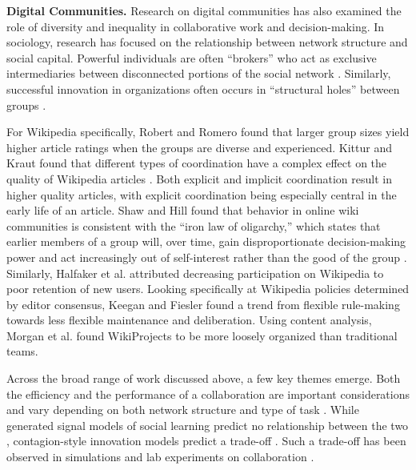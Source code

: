 \documentclass[letterpaper,twocolumn,10pt]{article}
\newcommand{\+}{\phantom{-}}
\begin{document}
{\bf Digital Communities.}
Research on digital communities has also examined the role of 
diversity and inequality
in collaborative work and decision-making.
In sociology, research has focused on the relationship between
network structure and social capital.
Powerful individuals are often ``brokers''
who act as exclusive intermediaries between disconnected portions of the
social network \cite{silverman_patronage_1965}.
Similarly, successful innovation in organizations often occurs in ``structural
holes'' between groups \cite{granovetter_strength_1973}.

For Wikipedia specifically,
Robert and Romero \cite{robert_crowd_2015} found that
larger group sizes yield higher article ratings
when the groups are diverse and experienced. Kittur and Kraut found that different types of coordination have a complex
effect on the quality of Wikipedia articles \cite{kittur_harnessing_2008}.
Both explicit and implicit coordination result in higher quality articles,
with explicit coordination being especially central in the early life of an
article.
Shaw and Hill \cite{shaw_laboratories_2014}
found that behavior in online wiki communities is consistent
with the ``iron law of oligarchy,''
which states that
earlier members of a group will, over time, gain disproportionate
decision-making power and act increasingly out of self-interest rather than
the good of the group \cite{michels_political_1999}.
Similarly, Halfaker et al. \cite{halfaker_rise_2013} attributed decreasing
participation on Wikipedia to poor retention of new users.
Looking specifically at Wikipedia policies determined by editor consensus,
Keegan and Fiesler \cite{keegan_evolution_2017} found a trend
from flexible rule-making towards less flexible maintenance and deliberation.
Using content analysis,
Morgan et al. \cite{morgan_project_2013} found WikiProjects to be
more loosely organized than traditional teams.

Across the broad range of work discussed above,
a few key themes emerge.
Both the efficiency and the performance of a collaboration are important
considerations and vary depending on both network structure and type of task
\cite{kearns_experiments_2012}.
While generated signal models of social learning predict no relationship
between the two
\cite{golub_naive_2010},
contagion-style innovation models predict a trade-off
\cite{mason_collaborative_2012,barkoczi_social_2016}.
Such a trade-off has been observed in simulations and lab experiments on
collaboration
\cite{kearns_experiments_2012,grim_scientific_2013}.
\end{document}
